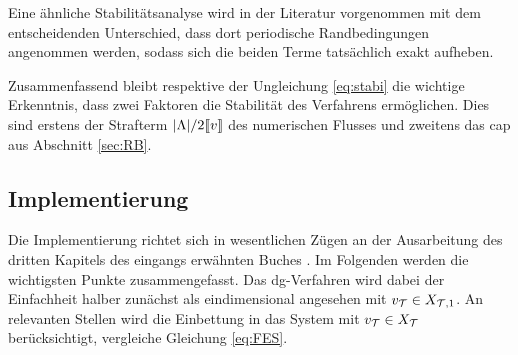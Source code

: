 Eine ähnliche Stabilitätsanalyse wird in der Literatur \cite{NLS} vorgenommen mit dem entscheidenden Unterschied, dass dort periodische Randbedingungen angenommen werden, sodass sich die beiden Terme tatsächlich exakt aufheben.

Zusammenfassend bleibt respektive der Ungleichung \eqref{eq:stabi} die wichtige Erkenntnis, dass zwei Faktoren die Stabilität des Verfahrens ermöglichen. Dies sind erstens der Strafterm $|\Lambda|/2\llbracket v \rrbracket$ des numerischen Flusses und zweitens das \ac{cap} aus Abschnitt \ref{sec:RB}.

\subsection{Implementierung}
Die Implementierung richtet sich in wesentlichen Zügen an der Ausarbeitung des dritten Kapitels des eingangs erwähnten Buches \cite{buch}. Im Folgenden werden die wichtigsten Punkte zusammengefasst. Das \ac{dg}-Verfahren wird dabei der Einfachheit halber zunächst als eindimensional angesehen mit $v_{\mathcal{T}} \in X_{\mathcal{T},1}$. An relevanten Stellen wird die Einbettung in das System mit $v_{\mathcal{T}} \in X_{\mathcal{T}}$ berücksichtigt, vergleiche Gleichung \eqref{eq:FES}.

